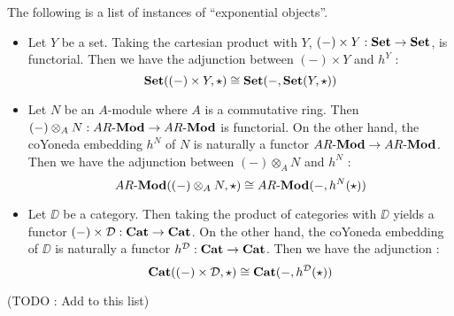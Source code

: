 \begin{eg}[Adjunctions]
  The following is a list of instances of ``exponential objects''.
  \begin{itemize}
    \item Let $Y$ be a set. 
    Taking the cartesian product with $Y$, 
    $(-)\times Y : \mathbf{Set} \to \mathbf{Set}$, is functorial.
    Then we have the adjunction between $(-)\times Y$ and $h^Y$ : 
    \[
      \mathbf{Set}((-)\times Y, \star) \cong \mathbf{Set}(-, \mathbf{Set}(Y, \star))
    \]
    \item Let $N$ be an $A$-module where $A$ is a commutative ring. 
    Then $(-) \otimes_A N : AR\text{-}\mathbf{Mod} \to AR\text{-}\mathbf{Mod}$ is functorial.
    On the other hand, the coYoneda embedding $h^N$ of $N$ is naturally 
    a functor $AR\text{-}\mathbf{Mod} \to AR\text{-}\mathbf{Mod}$. 
    Then we have the adjunction between $(-)\otimes_A N$ and $h^N$ : 
    \[
      AR\text{-}\mathbf{Mod}((-)\otimes_A N, \star) \cong AR\text{-}\mathbf{Mod}(-,h^N(\star))
    \]
    \item Let $\DD$ be a category. 
    Then taking the product of categories with $\DD$ yields a 
    functor $(-) \times \mathcal{D} : \mathbf{Cat} \to \mathbf{Cat}$.
    On the other hand, the coYoneda embedding of $\DD$ is naturally a functor
    $h^{\mathcal{D}} : \mathbf{Cat} \to \mathbf{Cat}$. 
    Then we have the adjunction : \[
      \mathbf{Cat}((-)\times \mathcal{D}, \star) \cong \mathbf{Cat}(-,h^{\mathcal{D}}(\star))
    \]
  \end{itemize}

  (TODO : Add to this list)

\end{eg}